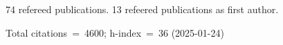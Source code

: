 74 refereed publications. 13 refeered publications as first author.

Total citations~=~4600; h-index~=~36 (2025-01-24)